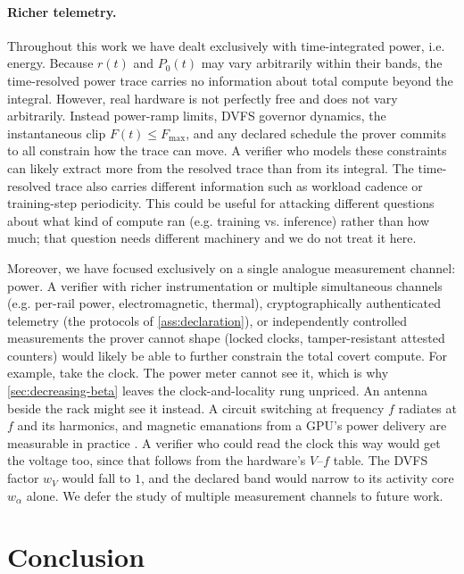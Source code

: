 \documentclass{article}
\theoremstyle{plain}
\theoremstyle{definition}
\theoremstyle{remark}
\begin{document}
\paragraph{Richer telemetry.}
Throughout this work we have dealt exclusively with time-integrated power, i.e. energy. Because $r(t)$ and $P_0(t)$ may vary arbitrarily within their
bands, the time-resolved power trace carries no information about total compute beyond the integral. However, real hardware is not perfectly free and does not vary arbitrarily. Instead power-ramp limits, DVFS
governor dynamics, the instantaneous clip $F(t) \le F_{\max}$, and any
declared schedule the prover commits to all constrain how the trace
can move. A verifier who models these constraints can likely extract more from the
resolved trace than from its integral. The time-resolved trace also carries different information such as workload cadence or 
training-step periodicity. This could be useful for attacking different questions about what kind of compute
ran (e.g. training vs. inference) rather than how much; that question needs different machinery and we
do not treat it here.

Moreover, we have focused exclusively on a single analogue measurement channel: power. A verifier with richer
instrumentation or multiple simultaneous channels
(e.g. per-rail power, electromagnetic, thermal), cryptographically
authenticated telemetry (the protocols of \cref{ass:declaration}), or independently
controlled measurements the prover cannot shape (locked clocks,
tamper-resistant attested counters) would likely be able to further constrain the total covert compute. For example, take the clock. The power meter cannot see it, which is why
\cref{sec:decreasing-beta} leaves the clock-and-locality rung unpriced. An
antenna beside the rack might see it instead. A circuit switching at frequency
$f$ radiates at $f$ and its harmonics, and magnetic emanations from a GPU's
power delivery are measurable in practice \citep{maia2022magnetic}. A verifier
who could read the clock this way would get the voltage too, since that follows
from the hardware's $V$--$f$ table. The DVFS factor $w_V$ would fall to $1$, and
the declared band would narrow to its activity core $w_\alpha$ alone. We defer the study of multiple measurement channels to future work. 



\section{Conclusion}
\label{sec:conclusion}
\end{document}
